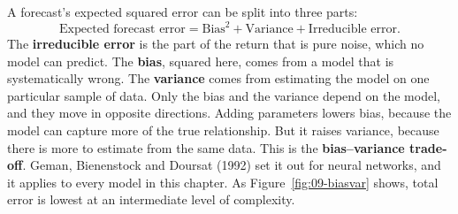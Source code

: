 A forecast's expected squared error can be split into three parts:
\begin{equation}
  \text{Expected forecast error} = \text{Bias}^2 + \text{Variance} + \text{Irreducible error}.
  \label{eq:20-biasvar}
\end{equation}
The \textbf{irreducible error} is the part of the return that is pure noise, which no model can predict. The \textbf{bias}, squared here, comes from a model that is systematically wrong. The \textbf{variance} comes from estimating the model on one particular sample of data. Only the bias and the variance depend on the model, and they move in opposite directions. Adding parameters lowers bias, because the model can capture more of the true relationship. But it raises variance, because there is more to estimate from the same data. This is the \textbf{bias--variance trade-off}. Geman, Bienenstock and Doursat (1992) set it out for neural networks, and it applies to every model in this chapter. As Figure~\ref{fig:09-biasvar} shows, total error is lowest at an intermediate level of complexity.


